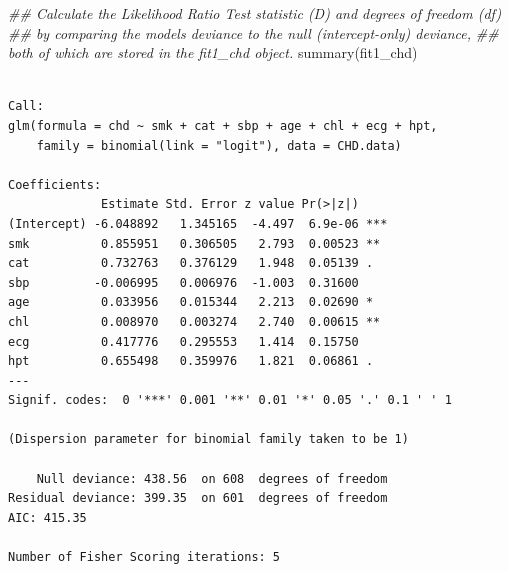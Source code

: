 \documentclass[
  letterpaper,
]{scrbook}
\newenvironment{Shaded}{\begin{snugshade}}{\end{snugshade}}
\newcommand{\DocumentationTok}[1]{\textcolor[rgb]{0.37,0.37,0.37}{\textit{#1}}}
\newcommand{\FunctionTok}[1]{\textcolor[rgb]{0.28,0.35,0.67}{#1}}
\newcommand{\NormalTok}[1]{\textcolor[rgb]{0.00,0.23,0.31}{#1}}
\begin{document}
\begin{Shaded}
\begin{Highlighting}[]
\DocumentationTok{\#\# Calculate the Likelihood Ratio Test statistic (D) and degrees of freedom (df)}
\DocumentationTok{\#\# by comparing the model\textquotesingle{}s deviance to the null (intercept{-}only) deviance,}
\DocumentationTok{\#\# both of which are stored in the \textquotesingle{}fit1\_chd\textquotesingle{} object.}
\FunctionTok{summary}\NormalTok{(fit1\_chd)}
\end{Highlighting}
\end{Shaded}

\begin{verbatim}

Call:
glm(formula = chd ~ smk + cat + sbp + age + chl + ecg + hpt, 
    family = binomial(link = "logit"), data = CHD.data)

Coefficients:
             Estimate Std. Error z value Pr(>|z|)    
(Intercept) -6.048892   1.345165  -4.497  6.9e-06 ***
smk          0.855951   0.306505   2.793  0.00523 ** 
cat          0.732763   0.376129   1.948  0.05139 .  
sbp         -0.006995   0.006976  -1.003  0.31600    
age          0.033956   0.015344   2.213  0.02690 *  
chl          0.008970   0.003274   2.740  0.00615 ** 
ecg          0.417776   0.295553   1.414  0.15750    
hpt          0.655498   0.359976   1.821  0.06861 .  
---
Signif. codes:  0 '***' 0.001 '**' 0.01 '*' 0.05 '.' 0.1 ' ' 1

(Dispersion parameter for binomial family taken to be 1)

    Null deviance: 438.56  on 608  degrees of freedom
Residual deviance: 399.35  on 601  degrees of freedom
AIC: 415.35

Number of Fisher Scoring iterations: 5
\end{verbatim}
\end{document}
